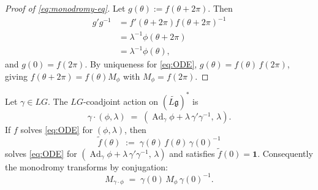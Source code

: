 \documentclass[12pt]{article}
\begin{document}
\begin{proof}[Proof of \eqref{eq:monodromy-eq}]
    Let $g(\theta):=f(\theta+2\pi)$. Then
    \begin{align*}
        g' g^{-1} & = f'(\theta+2\pi) f(\theta+2\pi)^{-1} \\
                  & = \lambda^{-1}\phi(\theta+2\pi)       \\
                  & = \lambda^{-1}\phi(\theta),
    \end{align*}
    and $g(0)=f(2\pi)$. By uniqueness for \eqref{eq:ODE}, $g(\theta)=f(\theta)\,f(2\pi)$, giving
    $f(\theta+2\pi)=f(\theta)M_\phi$ with $M_\phi=f(2\pi)$.
\end{proof}

\begin{proposition}
    Let $\gamma\in LG$. The $LG$-coadjoint action on
    $(\widetilde{L\mathfrak g})^*$ is
    \[
        \gamma\cdot(\phi,\lambda) \;=\; (\operatorname{Ad}_\gamma\phi + \lambda\,\gamma'\gamma^{-1},\,\lambda).
    \]
    If $f$ solves \eqref{eq:ODE} for $(\phi,\lambda)$, then
    \begin{equation}\label{eq:ftilde}
        \tilde f(\theta) \;:=\; \gamma(\theta)\,f(\theta)\,\gamma(0)^{-1}
    \end{equation}
    solves \eqref{eq:ODE} for $(\operatorname{Ad}_\gamma\phi + \lambda\,\gamma'\gamma^{-1},\,\lambda)$
    and satisfies $\tilde f(0)=\mathbf{1}$.
    Consequently the monodromy transforms by conjugation:
    \begin{equation}\label{eq:monodromy-conj}
        M_{\gamma\cdot\phi} \;=\; \gamma(0)\,M_\phi\,\gamma(0)^{-1}.
    \end{equation}
\end{proposition}
\end{document}
